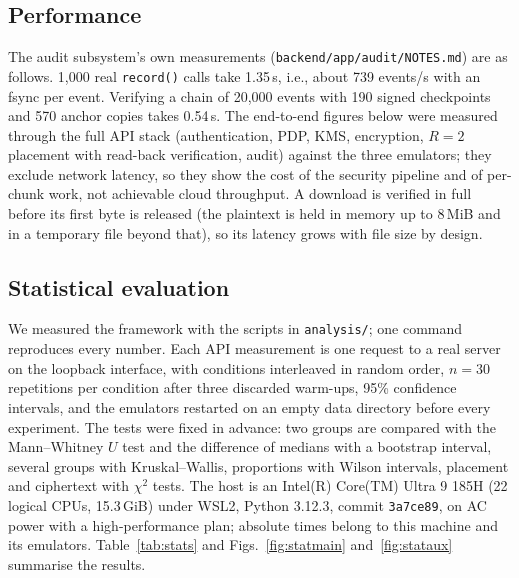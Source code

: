 \documentclass[conference]{IEEEtran}
\newcommand{\code}[1]{\texttt{\small #1}}
\begin{document}
\subsection{Performance}\label{sec:perf}
The audit subsystem's own measurements (\code{backend/app/audit/NOTES.md}) are as follows. 1,000 real \code{record()} calls take 1.35\,s, i.e., about 739 events/s with an fsync per event. Verifying a chain of 20,000 events with 190 signed checkpoints and 570 anchor copies takes 0.54\,s. The end-to-end figures below were measured through the full API stack (authentication, PDP, KMS, encryption, $R=2$ placement with read-back verification, audit) against the three emulators; they exclude network latency, so they show the cost of the security pipeline and of per-chunk work, not achievable cloud throughput. A download is verified in full before its first byte is released (the plaintext is held in memory up to 8\,MiB and in a temporary file beyond that), so its latency grows with file size by design.

\subsection{Statistical evaluation}\label{sec:stats}
We measured the framework with the scripts in \code{analysis/}; one command reproduces every number. Each API measurement is one request to a real server on the loopback interface, with conditions interleaved in random order, $n=30$ repetitions per condition after three discarded warm-ups, 95\% confidence intervals, and the emulators restarted on an empty data directory before every experiment. The tests were fixed in advance: two groups are compared with the Mann--Whitney $U$ test and the difference of medians with a bootstrap interval, several groups with Kruskal--Wallis, proportions with Wilson intervals, placement and ciphertext with $\chi^2$ tests. The host is an Intel(R) Core(TM) Ultra 9 185H (22 logical CPUs, 15.3\,GiB) under WSL2, Python 3.12.3, commit \code{3a7ce89}, on AC power with a high-performance plan; absolute times belong to this machine and its emulators. Table~\ref{tab:stats} and Figs.~\ref{fig:statmain} and~\ref{fig:stataux} summarise the results.
\end{document}
